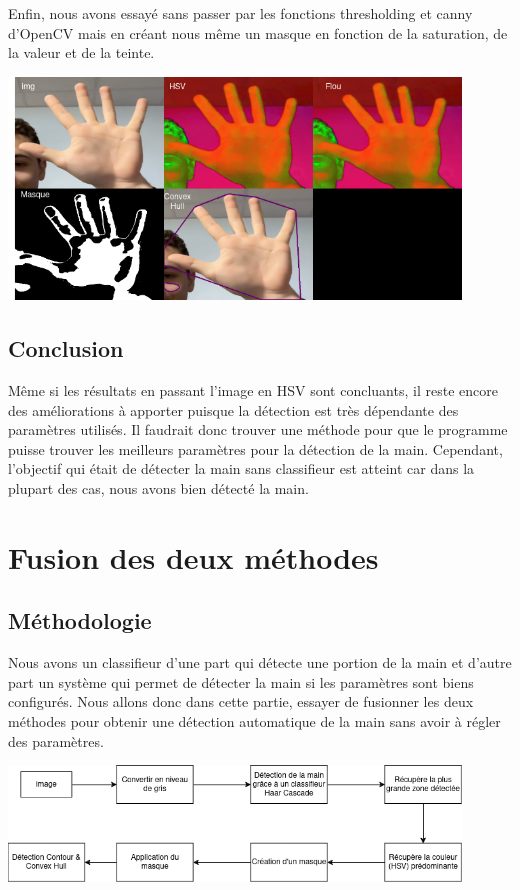 \documentclass[11pt]{article}
\begin{document}
Enfin, nous avons essayé sans passer par les fonctions thresholding et canny d'OpenCV mais en créant nous même un masque en fonction de la saturation, de la valeur et de la teinte.
\begin{center}
    \includegraphics[width=0.9\textwidth]{images/pre_ttt_6.png}
\end{center}
\newpage
\subsection{Conclusion}
Même si les résultats en passant l'image en HSV sont concluants, il reste encore des améliorations à apporter puisque la détection est très dépendante des paramètres utilisés. Il faudrait donc trouver une méthode pour que le programme puisse trouver les meilleurs paramètres pour la détection de la main. Cependant, l'objectif qui était de détecter la main sans classifieur est atteint car dans la plupart des cas, nous avons bien détecté la main.

\section{Fusion des deux méthodes}
\subsection{Méthodologie}
Nous avons un classifieur d'une part qui détecte une portion de la main et d'autre part un système qui permet de détecter la main si les paramètres sont biens configurés. Nous allons donc dans cette partie, essayer de fusionner les deux méthodes pour obtenir une détection automatique de la main sans avoir à régler des paramètres.

\begin{center}
    \includegraphics[width=0.9\textwidth]{images/pipeline_combinaison.png}
    \label{fig:pipeline_combinaison}
\end{center}
\end{document}
